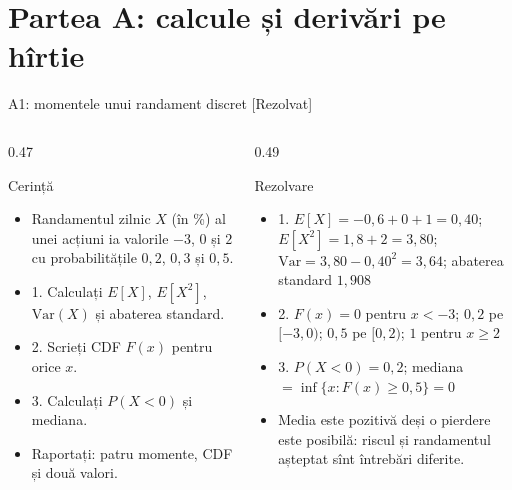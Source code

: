 \section{Partea A: calcule și derivări pe hîrtie}

\begin{frame}{A1: momentele unui randament discret [Rezolvat]}
\itemsize{\footnotesize}
\begin{columns}[T]
\begin{column}{0.47\textwidth}
\begin{block}{Cerință}
\begin{itemize}
    \item Randamentul zilnic $X$ (în \%) al unei acțiuni ia valorile $-3$, $0$ și $2$ cu probabilitățile $0{,}2$, $0{,}3$ și $0{,}5$.
    \item 1. Calculați $E[X]$, $E[X^2]$, $\text{Var}(X)$ și abaterea standard.
    \item 2. Scrieți CDF $F(x)$ pentru orice $x$.
    \item 3. Calculați $P(X < 0)$ și mediana.
    \item Raportați: patru momente, CDF și două valori.
\end{itemize}
\end{block}
\end{column}
\begin{column}{0.49\textwidth}
\begin{exampleblock}{Rezolvare}
\begin{itemize}
    \item 1. $E[X] = -0{,}6 + 0 + 1 = 0{,}40$; $E[X^2] = 1{,}8 + 2 = 3{,}80$; $\text{Var} = 3{,}80 - 0{,}40^2 = 3{,}64$; abaterea standard $1{,}908$
    \item 2. $F(x) = 0$ pentru $x < -3$; $0{,}2$ pe $[-3, 0)$; $0{,}5$ pe $[0, 2)$; $1$ pentru $x \ge 2$
    \item 3. $P(X < 0) = 0{,}2$; mediana $= \inf\{x : F(x) \ge 0{,}5\} = 0$
    \item Media este pozitivă deși o pierdere este posibilă: riscul și randamentul așteptat sînt întrebări diferite.
\end{itemize}
\end{exampleblock}
\end{column}
\end{columns}
\end{frame}

